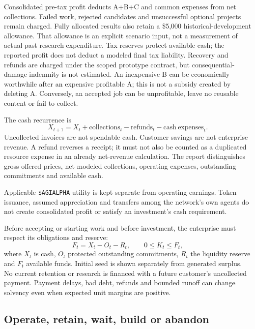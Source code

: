 \documentclass[11pt,a4paper]{article}
\newcommand{\usd}[1]{\$#1}
\begin{document}
Consolidated pre-tax profit deducts A+B+C and common expenses from net collections. Failed work, rejected candidates and unsuccessful optional projects remain charged. Fully allocated results also retain a \usd{5,000} historical-development allowance. That allowance is an explicit scenario input, not a measurement of actual past research expenditure. Tax reserves protect available cash; the reported profit does not deduct a modeled final tax liability. Recovery and refunds are charged under the scoped prototype contract, but consequential-damage indemnity is not estimated. An inexpensive B can be economically worthwhile after an expensive profitable A; this is not a subsidy created by deleting A. Conversely, an accepted job can be unprofitable, leave no reusable content or fail to collect.

The cash recurrence is
\begin{equation}
 X_{t+1}=X_t+\mathrm{collections}_t-\mathrm{refunds}_t-\mathrm{cash\ expenses}_t.
\end{equation}
Uncollected invoices are not spendable cash. Customer savings are not enterprise revenue. A refund reverses a receipt; it must not also be counted as a duplicated resource expense in an already net-revenue calculation. The report distinguishes gross offered prices, net modeled collections, operating expenses, outstanding commitments and available cash.

Applicable \texttt{\$AGIALPHA} utility is kept separate from operating earnings. Token issuance, assumed appreciation and transfers among the network's own agents do not create consolidated profit or satisfy an investment's cash requirement.

Before accepting or starting work and before investment, the enterprise must respect its obligations and reserve:
\begin{equation}
 F_t=X_t-O_t-R_t,\qquad 0\leq K_t\leq F_t,
\end{equation}
where $X_t$ is cash, $O_t$ protected outstanding commitments, $R_t$ the liquidity reserve and $F_t$ available funds. Initial seed is shown separately from generated surplus. No current retention or research is financed with a future customer's uncollected payment. Payment delays, bad debt, refunds and bounded runoff can change solvency even when expected unit margins are positive.

\subsection{Operate, retain, wait, build or abandon}
\end{document}
